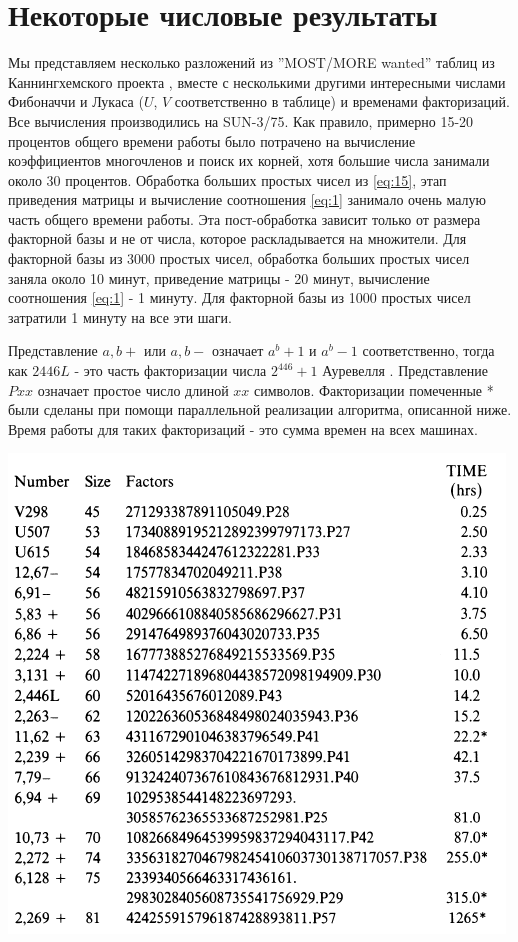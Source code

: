\documentclass[a4paper,12pt]{report}
\begin{document}
\section{Некоторые числовые результаты}

Мы представляем несколько разложений из ''MOST/MORE wanted'' таблиц из Каннингхемского проекта \cite{bull}, вместе с несколькими другими интересными числами Фибоначчи и Лукаса ($U$, $V$ соответственно в таблице) и временами факторизаций. Все вычисления производились на SUN-3/75. Как правило, примерно 15-20 процентов общего времени работы было потрачено на вычисление коэффициентов многочленов и поиск их корней, хотя большие числа занимали около 30 процентов. Обработка больших простых чисел из \eqref{eq:15}, этап приведения матрицы и вычисление соотношения \eqref{eq:1} занимало очень малую часть общего времени работы. Эта пост-обработка зависит только от размера факторной базы и не от числа, которое раскладывается на множители. Для факторной базы из 3000 простых чисел, обработка больших простых чисел заняла около 10 минут, приведение матрицы - 20 минут, вычисление соотношения \eqref{eq:1} - 1 минуту. Для факторной базы из 1000 простых чисел затратили 1 минуту на все эти шаги.

Представление $a,b+$ или $a,b-$ означает $a^b + 1$ и $a^b - 1$ соответственно, тогда как $2446L$ - это часть факторизации числа $2^446 + 1$ Ауревелля \cite{bull}. Представление $Pxx$ означает простое число длиной $xx$ символов. Факторизации помеченные * были сделаны при помощи параллельной реализации алгоритма, описанной ниже. Время работы для таких факторизаций - это сумма времен на всех машинах.

\includegraphics{times}
\end{document}

